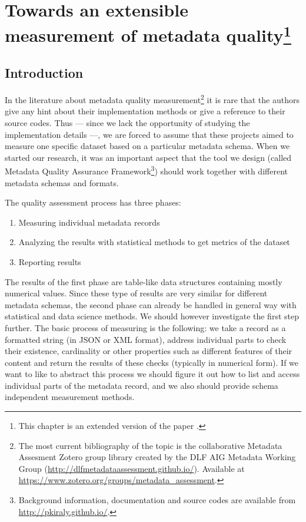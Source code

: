 \chapter[Towards an extensible measurement of metadata quality]{Towards an extensible measurement of metadata quality\footnote{This chapter is an extended version of the paper \cite{kiraly2017}.}}

\section{Introduction}

In the literature about metadata quality measurement\footnote{The most current bibliography of the topic is the collaborative Metadata Assesment Zotero group library created by the DLF AIG Metadata Working Group (\url{http://dlfmetadataassessment.github.io/}). Available at \url{https://www.zotero.org/groups/metadata_assessment}.} it is rare that the authors give any hint about their implementation methods or give a reference to their source codes. 
Thus --- since we lack the opportunity of studying the implementation details ---, we are forced to assume that these projects aimed to measure one specific dataset based on a particular metadata schema. When we started our research, it was an important aspect that the tool we design (called Metadata Quality Assurance Framework\footnote{Background information, documentation and source codes are available from \url{http://pkiraly.github.io/}.}) should work together with different metadata schemas and formats.

The quality assessment process has three phases:

\begin{enumerate}
\item Measuring individual metadata records
\item Analyzing the results with statistical methods to get metrics of the dataset
\item Reporting results
\end{enumerate}

The results of the first phase are table-like data structures containing mostly numerical values. Since these type of results are very similar for different metadata schemas, the second phase can already be handled in general way with statistical and data science methods. We should however investigate the first step further. The basic process of measuring is the following: we take a record as a formatted string (in JSON or XML format), address individual parts to check their existence, cardinality or other properties such as different features of their content and return the results of these checks (typically in numerical form). If we want to like to abstract this process we should figure it out how to list and access individual parts of the metadata record, and we also should provide schema independent measurement methods.


